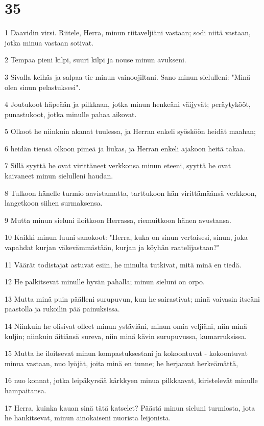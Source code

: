 \chapter{35}

\par 1 Daavidin virsi. Riitele, Herra, minun riitaveljiäni vastaan; sodi niitä vastaan, jotka minua vastaan sotivat.
\par 2 Tempaa pieni kilpi, suuri kilpi ja nouse minun avukseni.
\par 3 Sivalla keihäs ja salpaa tie minun vainoojiltani. Sano minun sielulleni: "Minä olen sinun pelastuksesi".
\par 4 Joutukoot häpeään ja pilkkaan, jotka minun henkeäni väijyvät; peräytykööt, punastukoot, jotka minulle pahaa aikovat.
\par 5 Olkoot he niinkuin akanat tuulessa, ja Herran enkeli syösköön heidät maahan;
\par 6 heidän tiensä olkoon pimeä ja liukas, ja Herran enkeli ajakoon heitä takaa.
\par 7 Sillä syyttä he ovat virittäneet verkkonsa minun eteeni, syyttä he ovat kaivaneet minun sielulleni haudan.
\par 8 Tulkoon hänelle turmio aavistamatta, tarttukoon hän virittämäänsä verkkoon, langetkoon siihen surmaksensa.
\par 9 Mutta minun sieluni iloitkoon Herrassa, riemuitkoon hänen avustansa.
\par 10 Kaikki minun luuni sanokoot: "Herra, kuka on sinun vertaisesi, sinun, joka vapahdat kurjan väkevämmästään, kurjan ja köyhän raatelijastaan?"
\par 11 Väärät todistajat astuvat esiin, he minulta tutkivat, mitä minä en tiedä.
\par 12 He palkitsevat minulle hyvän pahalla; minun sieluni on orpo.
\par 13 Mutta minä puin päälleni surupuvun, kun he sairastivat; minä vaivasin itseäni paastolla ja rukoilin pää painuksissa.
\par 14 Niinkuin he olisivat olleet minun ystäviäni, minun omia veljiäni, niin minä kuljin; niinkuin äitiänsä sureva, niin minä kävin surupuvussa, kumarruksissa.
\par 15 Mutta he iloitsevat minun kompastuksestani ja kokoontuvat - kokoontuvat minua vastaan, nuo lyöjät, joita minä en tunne; he herjaavat herkeämättä,
\par 16 nuo konnat, jotka leipäkyrsää kärkkyen minua pilkkaavat, kiristelevät minulle hampaitansa.
\par 17 Herra, kuinka kauan sinä tätä katselet? Päästä minun sieluni turmiosta, jota he hankitsevat, minun ainokaiseni nuorista leijonista.
